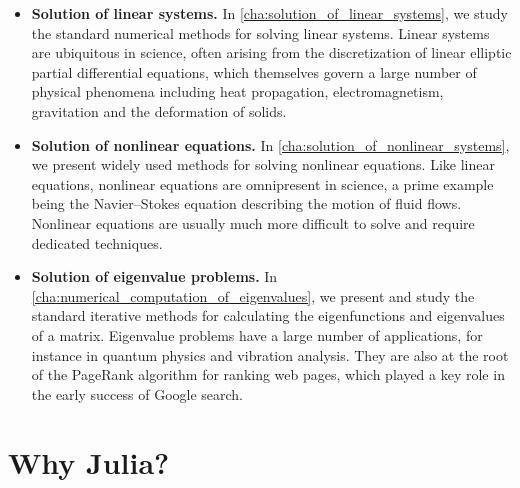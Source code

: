 \begin{itemize}
    \item
        \textbf{Solution of linear systems.}
        In \cref{cha:solution_of_linear_systems},
        we study the standard numerical methods for solving linear systems.
        Linear systems are ubiquitous in science,
        often arising from the discretization of linear elliptic partial differential equations,
        which themselves govern a large number of physical phenomena including heat propagation, electromagnetism, gravitation and the deformation of solids.

    \item
        \textbf{Solution of nonlinear equations.}
        In \cref{cha:solution_of_nonlinear_systems},
        we present widely used methods for solving nonlinear equations.
        Like linear equations, nonlinear equations are omnipresent in science,
        a prime example being the Navier--Stokes equation describing the motion of fluid flows.
        Nonlinear equations are usually much more difficult to solve and require dedicated techniques.

    \item
        \textbf{Solution of eigenvalue problems.}
        In \cref{cha:numerical_computation_of_eigenvalues},
        we present and study the standard iterative methods for calculating the eigenfunctions and eigenvalues of a matrix.
        Eigenvalue problems have a large number of applications,
        for instance in quantum physics and vibration analysis.
        They are also at the root of the PageRank algorithm for ranking web pages,
        which played a key role in the early success of Google search.

\end{itemize}


\section*{Why Julia?}%
\label{sec:why_julia_}

